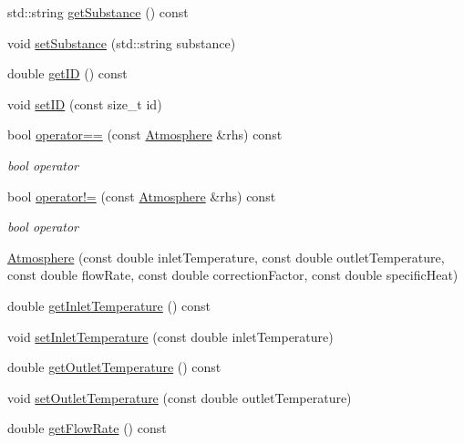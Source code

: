 \begin{DoxyCompactItemize}
\item 
std\+::string \hyperlink{class_atmosphere_a3ac0fb0d4fc92edc690e44b40b7018c2}{get\+Substance} () const
\item 
void \hyperlink{class_atmosphere_aa92f55a1f07304f3e57fdfb8ece65d82}{set\+Substance} (std\+::string substance)
\item 
double \hyperlink{class_atmosphere_a4dfda799563c28438db1b23cbee6e099}{get\+ID} () const
\item 
void \hyperlink{class_atmosphere_a156e09f05336057be5591146948f6046}{set\+ID} (const size\+\_\+t id)
\item 
\mbox{\label{class_atmosphere_a6bddf411a91af4808f52cd69033a5c54}} 
bool \hyperlink{class_atmosphere_a6bddf411a91af4808f52cd69033a5c54}{operator==} (const \hyperlink{class_atmosphere}{Atmosphere} \&rhs) const
\begin{DoxyCompactList}\small\item\em bool operator \end{DoxyCompactList}\item 
\mbox{\label{class_atmosphere_a8f75154e49eb74561dc9053607f502f9}} 
bool \hyperlink{class_atmosphere_a8f75154e49eb74561dc9053607f502f9}{operator!=} (const \hyperlink{class_atmosphere}{Atmosphere} \&rhs) const
\begin{DoxyCompactList}\small\item\em bool operator \end{DoxyCompactList}\item 
\hyperlink{class_atmosphere_adbd727cfc7682d3b3b72a4fb101531f1}{Atmosphere} (const double inlet\+Temperature, const double outlet\+Temperature, const double flow\+Rate, const double correction\+Factor, const double specific\+Heat)
\item 
double \hyperlink{class_atmosphere_acb944a3a99cd40f0132713ce73e6ca4a}{get\+Inlet\+Temperature} () const
\item 
void \hyperlink{class_atmosphere_a592bf7f82ea518fbd9da86d8f10cbc5c}{set\+Inlet\+Temperature} (const double inlet\+Temperature)
\item 
double \hyperlink{class_atmosphere_a717e2dc78ebd13420f8f26707374dd3f}{get\+Outlet\+Temperature} () const
\item 
void \hyperlink{class_atmosphere_a8f6589ab4e17d3c531bb7e0e771f4f80}{set\+Outlet\+Temperature} (const double outlet\+Temperature)
\item 
double \hyperlink{class_atmosphere_ad34708b12c8c9af4fce47669d68ebf4d}{get\+Flow\+Rate} () const

\end{DoxyCompactItemize}
